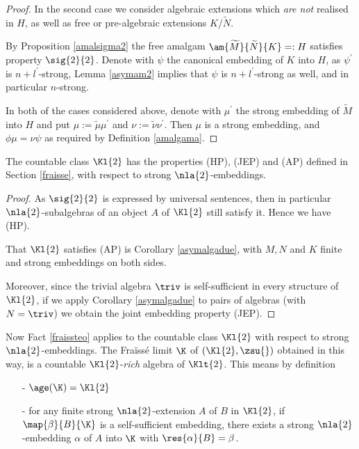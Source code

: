 \begin{proof}
\medskip
In the second case we consider algebraic extensions which {\em are not} realised
in $H$, as well as free or pre-algebraic extensions $K/\widetilde{N}$.

By Proposition \ref{amalsigma2} the free amalgam $\am{\widetilde{M}}{\widetilde{N}}{K}=:H$
satisfies property $\sig{2}{2}$. Denote with $\psi$ the canonical embedding of $K$
into $H$, as $\psi^{\prime}$ is $n+l^{\prime}$-strong, Lemma \ref{asymam2} implies that $\psi$ is
$n+l^{\prime}$-strong as well, and in particular $n$-strong. %

\smallskip
In both of the cases considered above, denote with
$\mu^{\prime}$ the strong embedding of $\widetilde{M}$ into $H$ and put
$\mu:=\widetilde{\mu}\mu^{\prime}$ and $\nu:=\widetilde{\nu}\nu^{\prime}$.
Then $\mu$ is a strong embedding, and $\phi\mu=\nu\psi$ as required
by Definition \ref{amalgama}.
\end{proof}

\begin{cor}\label{amalgadue}
The countable class $\Kl{2}$ has the properties {\rm(HP)}, {\rm(JEP)} and {\rm(AP)} defined in Section \ref{fraisse},
with respect to strong $\nla{2}$-embeddings.
\end{cor}
\begin{proof}
As $\sig{2}{2}$ is expressed by universal sentences, then in particular $\nla{2}$-subalgebras of an object $A$ of $\Kl{2}$
still satisfy it. Hence we have (HP).

That $\Kl{2}$ satisfies (AP) is Corollary \ref{asymalgadue},
with $M,N$ and $K$ finite and strong embeddings on both sides.

Moreover, since the trivial algebra $\triv$ is self-sufficient in every structure of $\Kl{2}$,
if we apply Corollary \ref{asymalgadue} to pairs of algebras (with $N=\triv$) we obtain
the joint embedding property (JEP).
\end{proof}
Now Fact \ref{fraissteo} applies to the countable class $\Kl{2}$ with respect to strong $\nla{2}$-embeddings.
The Fra\"iss\'e limit $\K$ of $(\Kl{2},\zsu{})$ obtained in this way, is a countable $\Kl{2}$-{\em rich} algebra of $\Klt{2}$. This means
by definition
\begin{itemize}
\item[-]$\age(\K)=\Kl{2}$
\item[-]for any finite strong $\nla{2}$-extension $A$ of $B$
in $\Kl{2}$, if $\map{\beta}{B}{\K}$ is a self-sufficient embedding, there exists a strong $\nla{2}$-embedding $\alpha$ of $A$ into $\K$
with $\res{\alpha}{B}=\beta$.
\end{itemize}